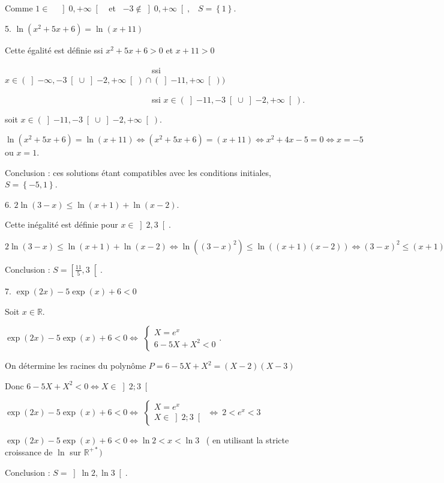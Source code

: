 \documentclass{article}
\begin{document}
Comme $1\in $\ \ $\left] 0,+\infty \right[ $ \ et \ $-3\notin \left]
0,+\infty \right[ ,$ \ $S=\left\{ 1\right\} .$

5. $\ln (x^{2}+5x+6)=\ln (x+11)$ \ \ 

Cette \'{e}galit\'{e} est d\'{e}finie ssi $x^{2}+5x+6>0$ et $x+11>0$

\ \ \ \ \ \ \ \ \ \ \ \ \ \ \ \ \ \ \ \ \ \ \ \ \ \ \ \ \ \ \ \ \ \ \ ssi $%
x\in \left( \left] -\infty ,-3\right[ \cup \left] -2,+\infty \right[ \right)
\cap \left( \left] -11,+\infty \right[ \right) )$

\ \ \ \ \ \ \ \ \ \ \ \ \ \ \ \ \ \ \ \ \ \ \ \ \ \ \ \ \ \ \ \ \ \ \ ssi $%
x\in \left( \left] -11,-3\right[ \cup \left] -2,+\infty \right[ \right) .$

soit $x\in \left( \left] -11,-3\right[ \cup \left] -2,+\infty \right[
\right) .$

$\ln (x^{2}+5x+6)=\ln (x+11)\Leftrightarrow
(x^{2}+5x+6)=(x+11)\Leftrightarrow x^{2}+4x-5=0\Leftrightarrow x=-5$ ou $%
x=1. $

Conclusion : ces solutions \'{e}tant compatibles avec les conditions
initiales, $S=\left\{ -5,1\right\} .$\ 

6. $2\ln (3-x)\leq \ln (x+1)+\ln (x-2).$\ \ \ \ 

Cette in\'{e}galit\'{e} est d\'{e}finie pour $x\in \left] 2,3\right[ .$

$2\ln (3-x)\leq \ln (x+1)+\ln (x-2)\Leftrightarrow \ln ((3-x)^{2})\leq \ln
\left( (x+1)(x-2)\right) \Leftrightarrow (3-x)^{2}\leq
(x+1)(x-2)\Leftrightarrow x\geq \frac{11}{5}.$

Conclusion : $S=\left[ \frac{11}{5},3\right[ .$\ \ \ \ \ \ \ \ \ \ \ \ \ \ \
\ \ \ \ \ \ \ \ \ \ \ 

7. $\exp (2x)-5\exp (x)+6<0$ \ \ \ \ \ \ \ \ \ 

Soit $x\in 
\mathbb{R}
.$

\bigskip $\exp (2x)-5\exp (x)+6<0\Leftrightarrow $ $\left\{ 
\begin{array}{c}
X=e^{x} \\ 
6-5X+X^{2}<0%
\end{array}%
\right. .$

On d\'{e}termine les racines du polyn\^{o}me $P=6-5X+X^{2}=(X-2)(X-3)$

Donc $6-5X+X^{2}<0\Leftrightarrow X\in \left] 2;3\right[ $

\bigskip $\exp (2x)-5\exp (x)+6<0\Leftrightarrow $ $\left\{ 
\begin{array}{c}
X=e^{x} \\ 
X\in \left] 2;3\right[%
\end{array}%
\right. \Leftrightarrow \ 2<e^{x}<3$

$\exp (2x)-5\exp (x)+6<0\Leftrightarrow \ln 2<x<\ln 3$ \ ( en utilisant la
stricte croissance de $\ln $ sur $%
\mathbb{R}
^{+\ast })$

Conclusion : $S=\left] \ln 2,\ln 3\right[ .$

\bigskip
\end{document}
